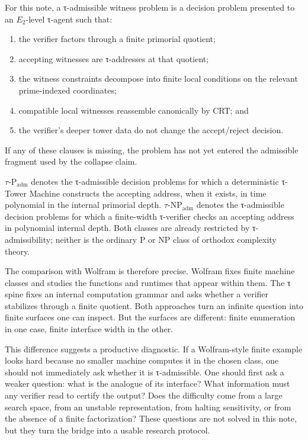 \documentclass{pantarhei-researchnote}
\newcommand{\Padm}{\ensuremath{\tau\text{-}\mathrm{P}_{\mathrm{adm}}}}
\newcommand{\NPadm}{\ensuremath{\tau\text{-}\mathrm{NP}_{\mathrm{adm}}}}
\newcommand{\Etwo}{\ensuremath{E_2}}
\newcommand{\ClassP}{\ensuremath{\mathrm{P}}}
\newcommand{\ClassNP}{\ensuremath{\mathrm{NP}}}
\begin{document}
\begin{definition}
For this note, a τ-admissible witness problem is a decision problem
presented to an \Etwo-level τ-agent such that:
\begin{enumerate}[leftmargin=1.2em,itemsep=1pt,topsep=2pt]
\item the verifier factors through a finite primorial quotient;
\item accepting witnesses are τ-addresses at that quotient;
\item the witness constraints decompose into finite local conditions on
the relevant prime-indexed coordinates;
\item compatible local witnesses reassemble canonically by CRT; and
\item the verifier's deeper tower data do not change the accept/reject
decision.
\end{enumerate}
If any of these clauses is missing, the problem has not yet entered the
admissible fragment used by the collapse claim.
\end{definition}

\begin{definition}[The classes \texorpdfstring{\(\Padm\)}{tau-Padm} and \texorpdfstring{\(\NPadm\)}{tau-NPadm} \scopetau]
\(\Padm\) denotes the τ-admissible decision problems for which a
deterministic τ-Tower Machine constructs the accepting address, when it
exists, in time polynomial in the internal primorial depth. \(\NPadm\)
denotes the τ-admissible decision problems for which a finite-width
τ-verifier checks an accepting address in polynomial internal depth. Both
classes are already restricted by τ-admissibility; neither is the
ordinary \(\ClassP\) or \(\ClassNP\) class of orthodox complexity theory.
\end{definition}

The comparison with Wolfram is therefore precise. Wolfram fixes finite
machine classes and studies the functions and runtimes that appear within
them. The τ spine fixes an internal computation grammar and asks whether a
verifier stabilizes through a finite quotient. Both approaches turn an
infinite question into finite surfaces one can inspect. But the surfaces
are different: finite enumeration in one case, finite interface width in
the other.

This difference suggests a productive diagnostic. If a Wolfram-style
finite example looks hard because no smaller machine computes it in the
chosen class, one should not immediately ask whether it is τ-admissible.
One should first ask a weaker question: what is the analogue of its
interface? What information must any verifier read to certify the output?
Does the difficulty come from a large search space, from an unstable
representation, from halting sensitivity, or from the absence of a finite
factorization? These questions are not solved in this note, but they
turn the bridge into a usable research protocol.
\end{document}
